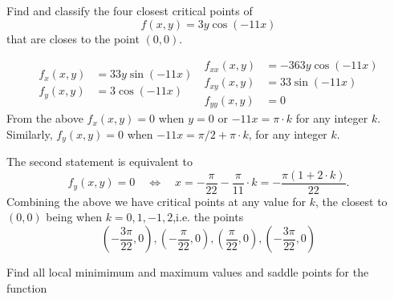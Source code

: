 \documentclass[12pt]{exam}
\newcommand{\bif}{\quad\iff\quad}
\begin{document}
\begin{questions}
\question Find and classify the four closest critical points of 
\[
    f(x,y)=3y\cos(-11x)
\] that are closes to the point \((0,0)\).
    \ifprintanswers
        \begin{solution}
            \begin{equation*}
                \begin{aligned}
                    f_{x}(x,y) & = 33y\sin(-11x)\\
                    f_{y}(x,y) &= 3\cos(-11x)
                \end{aligned} ~
                \begin{aligned}
                    f_{xx}(x,y) & = -363y\cos(-11x)\\
                    f_{xy}(x,y) & = 33\sin(-11x)\\
                    f_{yy}(x,y) & = 0
                \end{aligned}
            \end{equation*}
        From the above \(f_{x}(x,y)=0\) when \(y=0\) or \(-11x=\pi\cdot k\) for any integer \(k\). Similarly, \(f_y(x,y)=0\) when \(-11x=\pi/2+\pi\cdot k\), for any integer \(k\).

        The second statement is equivalent to 
        \[
            f_y(x,y)=0 \bif x= -\frac{\pi}{22}-\frac{\pi}{11}\cdot k = -\frac{\pi(1+2\cdot k)}{22}.
        \]
        Combining the above we have critical points at any value for \(k\), the closest to \((0,0)\) being when \(k=0,1,-1,2\),i.e. the points
        \[
            \left(-\frac{3\pi}{22},0\right), \left(-\frac{\pi}{22},0\right), \left(\frac{\pi}{22},0\right), \left(-\frac{3\pi}{22},0\right)
        \]
        \end{solution}
    \else
        \vfill
    \fi

\question Find all local minimimum and maximum values and saddle points for the function


\end{questions}
\end{document}
